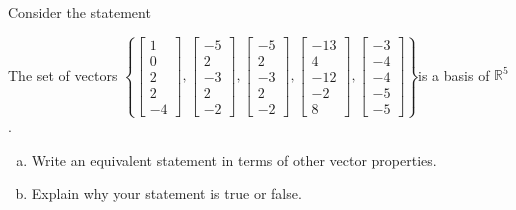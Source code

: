 
\begin{exerciseStatement}


Consider the statement 
\begin{center}\begin{minipage}{0.8\textwidth}
 The set of vectors \( \left\{ \left[\begin{array}{c}
1 \\
0 \\
2 \\
2 \\
-4
\end{array}\right] , \left[\begin{array}{c}
-5 \\
2 \\
-3 \\
2 \\
-2
\end{array}\right] , \left[\begin{array}{c}
-5 \\
2 \\
-3 \\
2 \\
-2
\end{array}\right] , \left[\begin{array}{c}
-13 \\
4 \\
-12 \\
-2 \\
8
\end{array}\right] , \left[\begin{array}{c}
-3 \\
-4 \\
-4 \\
-5 \\
-5
\end{array}\right] \right\} \)is a basis of \(\mathbb{R}^5\). 
\end{minipage}\end{center}
    


\begin{enumerate}[(a)]
\item  Write an equivalent statement in terms of other vector properties.
\item  Explain why your statement is true or false.
\end{enumerate}
    
\end{exerciseStatement}
    

